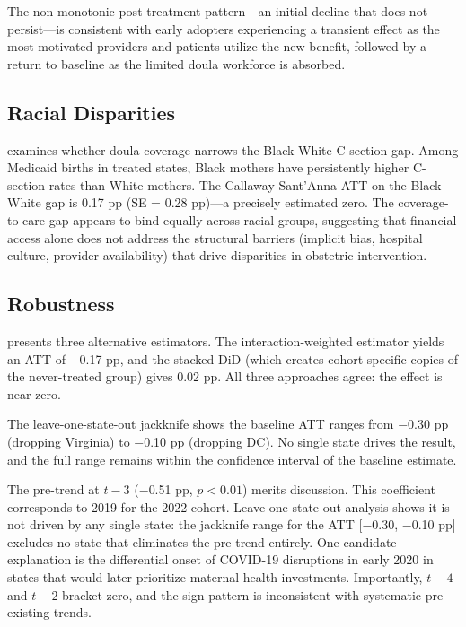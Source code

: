 \documentclass[12pt]{article}
\begin{document}
The non-monotonic post-treatment pattern---an initial decline that does not persist---is consistent with early adopters experiencing a transient effect as the most motivated providers and patients utilize the new benefit, followed by a return to baseline as the limited doula workforce is absorbed.



\subsection{Racial Disparities}

 examines whether doula coverage narrows the Black-White C-section gap. Among Medicaid births in treated states, Black mothers have persistently higher C-section rates than White mothers. The Callaway-Sant'Anna ATT on the Black-White gap is 0.17 pp (SE = 0.28 pp)---a precisely estimated zero. The coverage-to-care gap appears to bind equally across racial groups, suggesting that financial access alone does not address the structural barriers (implicit bias, hospital culture, provider availability) that drive disparities in obstetric intervention.



\subsection{Robustness}

 presents three alternative estimators. The \citet{sun2021} interaction-weighted estimator yields an ATT of $-$0.17 pp, and the stacked DiD (which creates cohort-specific copies of the never-treated group) gives 0.02 pp. All three approaches agree: the effect is near zero.

The leave-one-state-out jackknife shows the baseline ATT ranges from $-$0.30 pp (dropping Virginia) to $-$0.10 pp (dropping DC). No single state drives the result, and the full range remains within the confidence interval of the baseline estimate.

The pre-trend at $t-3$ ($-$0.51 pp, $p < 0.01$) merits discussion. This coefficient corresponds to 2019 for the 2022 cohort. Leave-one-state-out analysis shows it is not driven by any single state: the jackknife range for the ATT [$-$0.30, $-$0.10 pp] excludes no state that eliminates the pre-trend entirely. One candidate explanation is the differential onset of COVID-19 disruptions in early 2020 in states that would later prioritize maternal health investments. Importantly, $t-4$ and $t-2$ bracket zero, and the sign pattern is inconsistent with systematic pre-existing trends.
\end{document}
